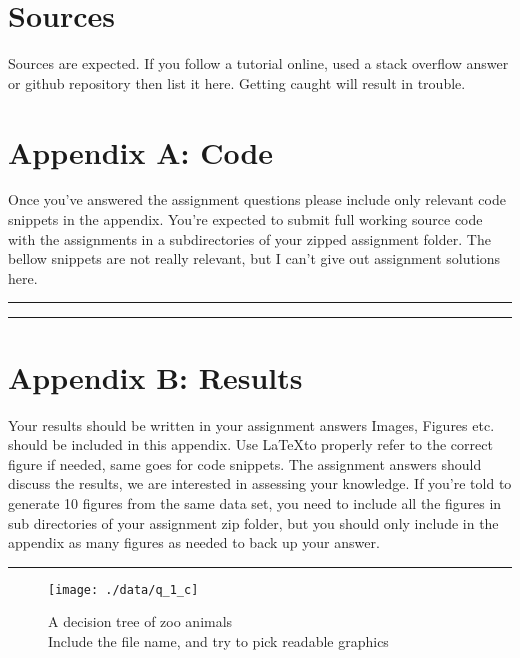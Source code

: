 \documentclass[	DIV=calc,%
				paper=a4,%
				fontsize=11pt,%
				twocolumn]{scrartcl}	 %
\newcommand{\HorRule}{\color{brsublue}%
					 \rule{\linewidth}{1pt}%
					 \color{black}
					 }
\begin{document}
\section*{Sources}
Sources are expected. If you follow a tutorial online, used a stack overflow answer or github repository then list it here. Getting caught will result in trouble.
\blindenumerate[3]

\newpage

\onecolumn
\section*{Appendix A: Code}

Once you've answered the assignment questions please include only relevant code snippets in the appendix. You're expected to submit full working source code with the assignments in a subdirectories of your zipped assignment folder. The bellow snippets are not really relevant, but I can't give out assignment solutions here. 

\HorRule



\HorRule



\newpage


\section*{Appendix B: Results}

Your results should be written in your assignment answers Images, Figures etc. should be included in this appendix. Use \LaTeX to properly refer to the correct figure if needed, same goes for code snippets. The assignment answers should discuss the results, we are interested in assessing your knowledge. If you're told to generate 10 figures from the same data set, you need to include all the figures in sub directories of your assignment zip folder, but you should only include in the appendix as many figures as needed to back up your answer. 

\HorRule

\begin{figure}[h]
  \centering
  \caption{A decision tree of zoo animals \\ Include the file name, and try to pick readable graphics}
  \texttt{[image: ./data/q\_1\_c]}
\end{figure}
\end{document}
